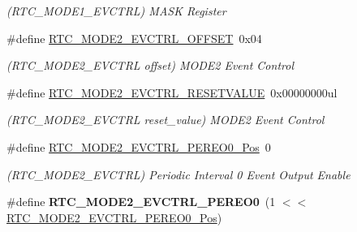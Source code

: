 \begin{DoxyCompactItemize}
\begin{DoxyCompactList}\small\item\em (R\+T\+C\+\_\+\+M\+O\+D\+E1\+\_\+\+E\+V\+C\+T\+R\+L) M\+A\+S\+K Register \end{DoxyCompactList}\item 
\hypertarget{group___s_a_m_l21___r_t_c_ga8e7118fe025c6ae2e47c4cf29b0dc1a3}{}\#define \hyperlink{group___s_a_m_l21___r_t_c_ga8e7118fe025c6ae2e47c4cf29b0dc1a3}{R\+T\+C\+\_\+\+M\+O\+D\+E2\+\_\+\+E\+V\+C\+T\+R\+L\+\_\+\+O\+F\+F\+S\+E\+T}~0x04\label{group___s_a_m_l21___r_t_c_ga8e7118fe025c6ae2e47c4cf29b0dc1a3}

\begin{DoxyCompactList}\small\item\em (R\+T\+C\+\_\+\+M\+O\+D\+E2\+\_\+\+E\+V\+C\+T\+R\+L offset) M\+O\+D\+E2 Event Control \end{DoxyCompactList}\item 
\hypertarget{group___s_a_m_l21___r_t_c_gaadbf1077f86d471a2207e5e860eedad7}{}\#define \hyperlink{group___s_a_m_l21___r_t_c_gaadbf1077f86d471a2207e5e860eedad7}{R\+T\+C\+\_\+\+M\+O\+D\+E2\+\_\+\+E\+V\+C\+T\+R\+L\+\_\+\+R\+E\+S\+E\+T\+V\+A\+L\+U\+E}~0x00000000ul\label{group___s_a_m_l21___r_t_c_gaadbf1077f86d471a2207e5e860eedad7}

\begin{DoxyCompactList}\small\item\em (R\+T\+C\+\_\+\+M\+O\+D\+E2\+\_\+\+E\+V\+C\+T\+R\+L reset\+\_\+value) M\+O\+D\+E2 Event Control \end{DoxyCompactList}\item 
\hypertarget{group___s_a_m_l21___r_t_c_gabcb181112a56aeecec631b74abedeb3d}{}\#define \hyperlink{group___s_a_m_l21___r_t_c_gabcb181112a56aeecec631b74abedeb3d}{R\+T\+C\+\_\+\+M\+O\+D\+E2\+\_\+\+E\+V\+C\+T\+R\+L\+\_\+\+P\+E\+R\+E\+O0\+\_\+\+Pos}~0\label{group___s_a_m_l21___r_t_c_gabcb181112a56aeecec631b74abedeb3d}

\begin{DoxyCompactList}\small\item\em (R\+T\+C\+\_\+\+M\+O\+D\+E2\+\_\+\+E\+V\+C\+T\+R\+L) Periodic Interval 0 Event Output Enable \end{DoxyCompactList}\item 
\hypertarget{group___s_a_m_l21___r_t_c_ga372263f208d699c0012089888a02ea46}{}\#define {\bfseries R\+T\+C\+\_\+\+M\+O\+D\+E2\+\_\+\+E\+V\+C\+T\+R\+L\+\_\+\+P\+E\+R\+E\+O0}~(1 $<$$<$ \hyperlink{group___s_a_m_l21___r_t_c_gabcb181112a56aeecec631b74abedeb3d}{R\+T\+C\+\_\+\+M\+O\+D\+E2\+\_\+\+E\+V\+C\+T\+R\+L\+\_\+\+P\+E\+R\+E\+O0\+\_\+\+Pos})\label{group___s_a_m_l21___r_t_c_ga372263f208d699c0012089888a02ea46}


\end{DoxyCompactItemize}
